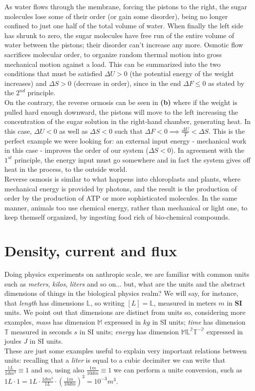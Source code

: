 \documentclass[../main/main.tex]{subfiles}
\begin{document}
As water flows through the membrane, forcing the pistons to the right, the sugar molecules lose some of their order (or gain some disorder), being no longer confined to just one half of the total volume of water. When finally the left side has shrunk to zero, the sugar molecules have free run of the entire volume of water between the pistons; their disorder can't increase any more. Osmotic flow sacrifices molecular
order, to organize random thermal motion into gross mechanical motion against a load. This can be summarized into the two conditions that must be satisfied $\Delta U>0 $ (the potential energy of the weight increases) and $\Delta S>0$ (decrease in order), since in the end $\Delta F \leq 0$ as stated by the $2^{nd}$ principle. \\
On the contrary, the reverse ormosis can be seen in \textbf{(b)} where if the weight is pulled hard enough downward, the pistons will move to the left increasing the concentration of the sugar solution in the right-hand chamber, generating heat. In this case, $\Delta U<0$ as well as $\Delta S<0$ such that $\Delta F <0\implies \frac{\Delta U}{T} < \Delta S$. This is the perfect example we were looking for: an external input energy - mechanical work in this case - improves the order of our system ($\Delta S <0$). 
In agreement with the $1^{st}$ principle, the energy input must go somewhere and in fact the system gives off heat in the process, to the outside world.\\
Reverse osmosis is similar to what happens into chloroplasts and plants, where mechanical energy is provided by photons, and the result is the production of order by the production of ATP or more sophisticated molecules. In the same manner, animals too use chemical energy, rather than mechanical or light one, to keep themself organized, by ingesting food rich of bio-chemical compounds.


\section{Density, current and flux}
Doing physics experiments on anthropic scale, we are familiar with common units such as \emph{meters}, \emph{kilos}, \emph{liters} and so on... but, what are the units and the abstract dimensions of things in the biological physics realm? 
We will say, for instance, that \emph{length} has dimensions $\mathbb{L}$, so writing $[L] = \mathbb{L}$, measured in meters $m$ in \textbf{SI} units. We point out that dimensions are distinct from units so, considering more examples, \emph{mass} has dimension $\mathbb{M}$ expressed in $kg$ in SI units; \emph{time} has dimension $\mathbb{T}$ measured in seconds $s$ in SI units; \emph{energy} has dimension $\mathbb{ML^2T^{-2}}$ expressed in joules $J$ in SI units. \\ 
These are just some examples useful to explain very important relations between units: recalling that a \emph{liter} is equal to a cubic decimiter we can write that $\frac{1L}{1dm^3}\equiv1$ and so, using also $\frac{1m}{10dm}\equiv1$ we can perform a unite conversion, such as $1L\cdot 1 = 1L\cdot\frac{1dm^3}{1L}\cdot(\frac{1m}{10dm})^3 = 10^{-3}m^3$.
\end{document}
